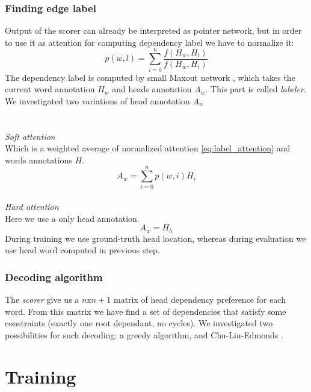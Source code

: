 \subsubsection{Finding edge label}
Output of the scorer can already be interpreted as
pointer network, but in order to use it as attention for computing dependency label
we have to normalize it:
\begin{equation} \label{eq:label_attention}
    p(w,l) = \sum_{i=0}^{n} \frac{f(H_w, H_l)}{f(H_w, H_i)}
\end{equation}
The dependency label is computed by small Maxout network \cite{goodfellow_maxout_2013},
which takes the current word annotation $H_w$ and heads annotation $A_w$. This
part is called \emph{labeler}.
We investigated two variations of head annotation $A_w$
\\
\\
\\
\emph{Soft attention}\\
Which is a weighted average of normalized attention \ref{eq:label_attention}
and words annotations $H$. 
$$ A_w = \sum_{i=0}^{n} p(w,i)H_i $$
\\
\emph{Hard attention}\\
Here we use a only head annotation.
$$ A_w = H_h $$
During training we use ground-truth head location, whereas during evaluation
we use head word computed in previous step.

\subsubsection{Decoding algorithm}
The \emph{scorer} give us a $n$x$n+1$ matrix of head dependency preference
for each word. From this matrix we have find a set of dependencies that satisfy
some constraints (exactly one root dependant, no cycles).
We investigated two possibilities for such decoding: a greedy algorithm, and
Chu-Liu-Edmonds \cite{edmonds_optimim_1966}.

\section{Training}
